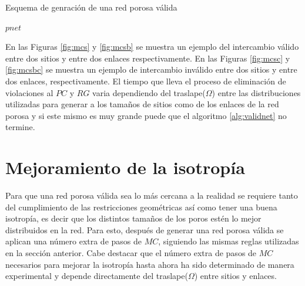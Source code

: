 \begin{algorithm}
\caption{Esquema de genración de una red porosa válida}\label{alg:validnet}
\begin{algorithmic}[1]
\Require $pnet$
	\State {}
		\State {}
	\EndIf
\EndWhile
\end{algorithmic}
\end{algorithm}

En las Figuras \ref{fig:mcs} y \ref{fig:mcsb} se muestra un ejemplo del intercambio válido entre dos sitios y entre dos enlaces 
respectivamente. En las Figuras \ref{fig:mcsc} y \ref{fig:mcsbc} se muestra un ejemplo de intercambio inválido entre dos sitios y entre 
dos enlaces, respectivamente. El tiempo que lleva el proceso de eliminación de violaciones al $PC$ y $RG$ varia dependiendo 
del traslape($\Omega$) entre las distribuciones utilizadas para generar a los tamaños de sitios como de los enlaces de la red porosa 
y si este mismo es muy grande puede que el algoritmo \ref{alg:validnet} no termine.


\section{Mejoramiento de la isotropía}
\label{sec:isotropy}
Para que una red porosa válida sea lo más cercana a la realidad se requiere tanto del cumplimiento de las restricciones 
geométricas así como tener una buena isotropía, es decir que los distintos tamaños de los poros estén lo mejor distribuidos en 
la red. Para esto, después de generar una red porosa válida se aplican una número extra de pasos de $MC$, siguiendo las mismas reglas 
utilizadas en la sección anterior. Cabe destacar que el número extra de pasos de $MC$ necesarios para mejorar la isotropía 
hasta ahora ha sido determinado de manera experimental y
depende directamente del traslape($\Omega$) entre sitios y enlaces.

